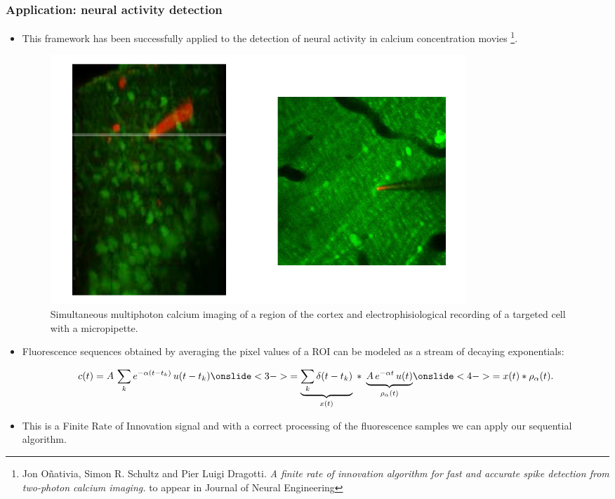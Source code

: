 \documentclass[8pt]{beamer}
\begin{document}
\begin{frame}
\frametitle{Application: neural activity detection}

\begin{itemize}

\item<1-> This framework has been successfully applied to the detection of neural activity in 
calcium concentration movies
\footnote{Jon O\~{n}ativia, Simon R. Schultz and Pier Luigi Dragotti. 
\textit{A finite rate of innovation algorithm for fast and accurate spike detection from
two-photon calcium imaging.} to appear in Journal of Neural Engineering}.


\begin{figure}[h]
\includegraphics[width=.3\linewidth]{figures/calcium}
\caption{Simultaneous multiphoton calcium imaging of a region of the cortex 
and electrophisiological recording of a targeted cell with a micropipette.}
\end{figure}

\item<2-> Fluorescence sequences obtained by averaging the pixel values of a ROI
can be modeled as a stream of decaying exponentials:

\begin{tiny}
\begin{equation*}
c(t) 
= A \, \sum_{k} e^{-\alpha(t-t_k)} \, u(t-t_k)
\onslide<3->{
= \underbrace{\sum_{k} \delta(t-t_k)}_{x(t)} \; * \;
  \underbrace{A \, e^{-\alpha t} \, u(t)}_{\rho_\alpha(t)}}
\onslide<4->{
= x(t) * \rho_\alpha(t).}
\end{equation*}
\end{tiny}

\item<5-> This is a Finite Rate of Innovation signal and with a correct processing 
of the fluorescence samples we can apply our sequential algorithm.

\end{itemize}

\end{frame}
\end{document}
